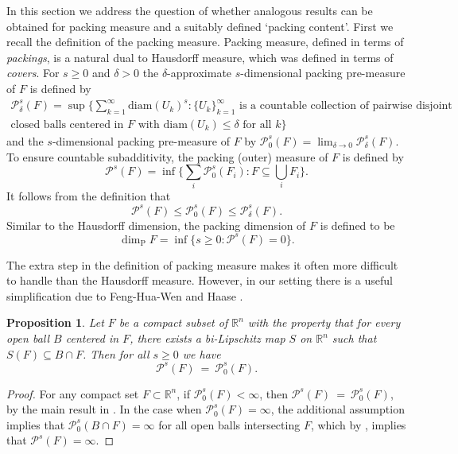 \documentclass[11pt,english,british]{article}
\numberwithin{equation}{section}
\newtheorem{prop}[thm]{Proposition}
\renewcommand{\geq}{\geqslant}
\renewcommand{\leq}{\leqslant}
\begin{document}
In this section we address the question of whether analogous results can be obtained for packing measure and a suitably defined `packing content'.  First we recall the definition of the packing measure.  Packing measure, defined in terms of \emph{packings}, is a natural dual to Hausdorff measure, which was defined in terms of \emph{covers}.  For $s \geq 0$ and $\delta>0$ the $\delta$-approximate $s$-dimensional packing pre-measure of $F$ is defined by
\begin{eqnarray*}
\mathcal{P}_{\delta}^s (F) = \sup \bigg\{ \sum_{k=1}^{\infty} \text{diam}(U_k )^s : \{ U_k \}_{k=1}^{\infty} \text{ is a countable collection of pairwise disjoint } \\ 
\text{closed balls centered in $F$  with $\text{diam}(U_k) \leq \delta$ for all $k$} \bigg\}
\end{eqnarray*}
and the $s$-dimensional packing pre-measure of $F$ by $\mathcal{P}_0^s (F) = \lim_{\delta \to 0} \mathcal{P}_{\delta}^s (F)$.  To ensure countable subadditivity, the packing (outer) measure of $F$ is defined by
\[
\mathcal{P}^s (F) = \inf \bigg\{\sum_i \mathcal{P}_0^s (F_i) : F \subseteq \bigcup_i F_i  \bigg\}.
\]
It follows from the definition that
\begin{equation}
 \mathcal{P}^s (F)\leq \mathcal{P}_{0}^s (F)\leq \mathcal{P}_{\delta}^s (F).\label{packineq}
\end{equation}
Similar to the Hausdorff dimension, the packing dimension of $F$ is defined to be
\[
\dim_\text{P} F = \inf \Big\{ s \geq 0: \mathcal{P}^s (F) =0 \Big\}.
\]

The extra step in the definition of packing measure makes it often more difficult to handle than the Hausdorff measure.  However, in our setting there is a useful simplification due to Feng-Hua-Wen \cite{packingmeasure} and Haase \cite{haase}.

\begin{prop}
Let $F$ be a compact subset of $\mathbb{R}^n$ with the property that for every open ball $B$ centered in $F$, there exists a bi-Lipschitz map $S$ on $\mathbb{R}^n$ such that $S(F) \subseteq B \cap F$.  Then for all $s \geq 0$ we have
\[
\mathcal{P}^s (F) \ = \ \mathcal{P}_0^s (F).
\]
\end{prop}

\begin{proof}
For any compact set $F \subset \mathbb{R}^n$, if $\mathcal{P}^s_0 (F)  < \infty$, then $\mathcal{P}^s (F) \ = \ \mathcal{P}_0^s (F)$, by the main result in \cite{packingmeasure}.  In the case when $\mathcal{P}^s_0 (F)  = \infty$, the additional assumption implies that $\mathcal{P}^s_0 (B \cap F) = \infty$ for all open balls intersecting $F$, which by \cite[Lemma 4]{haase}, implies that $\mathcal{P}^s(F)  = \infty$.
\end{proof}
\end{document}
